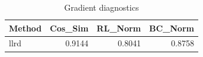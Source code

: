 \begin{table}[htbp]
\centering
\caption{Gradient diagnostics}
\label{tab:grad-diag}
\begin{tabular}{lrrr}
\toprule
\textbf{Method} & \textbf{Cos\_Sim} & \textbf{RL\_Norm} & \textbf{BC\_Norm} \\
\midrule
llrd & 0.9144 & 0.8041 & 0.8758 \\
\bottomrule
\end{tabular}
\end{table}